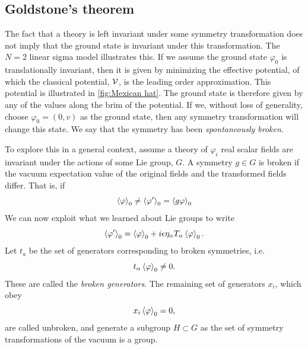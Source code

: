 \subsection*{Goldstone's theorem}

The fact that a theory is left invariant under some symmetry transformation does not imply that the ground state is invariant under this transformation.
The $N = 2$ linear sigma model illustrates this.
If we assume the ground state $\varphi_{0}$ is translationally invariant, then it is given by minimizing the effective potential, of which the classical potential, $\mathcal{V}$, is the leading order approximation.
This potential is illustrated in \autoref{fig:Mexican hat}.
The ground state is therefore given by any of the values along the brim of the potential.
If we, without loss of generality, choose $\varphi_0 = (0, v)$ as the ground state, then any symmetry transformation will change this state.
We say that the symmetry has been \emph{spontaneously broken}.

To explore this in a general context, assume a theory of $\varphi_i$ real scalar fields are invariant under the actions of some Lie group, $G$.
A symmetry $g \in G$ is broken if the vacuum expectation value of the original fields and the transformed fields differ.
That is, if
\begin{equation}
    \ex{\varphi}_0 \neq \ex{\varphi'}_0 = \ex{g \varphi}_0
\end{equation}
We can now exploit what we learned about Lie groups to write
\begin{equation}
    \ex{\varphi'}_0 = \ex{\varphi}_0 + i \epsilon \eta_\alpha T_\alpha \ex{\varphi}_0.
\end{equation}
Let $t_a$ be the set of generators corresponding to broken symmetries, i.e.
\begin{equation}
    t_\alpha \ex{\varphi}_0 \neq 0.
\end{equation}
These are called the \emph{broken generators}.
The remaining set of generators $x_i$, which obey
\begin{equation}
    x_i \ex{\varphi}_0 = 0,
\end{equation}
are called unbroken, and generate a subgroup $H \subset G$ as the set of symmetry transformations of the vacuum is a group.

